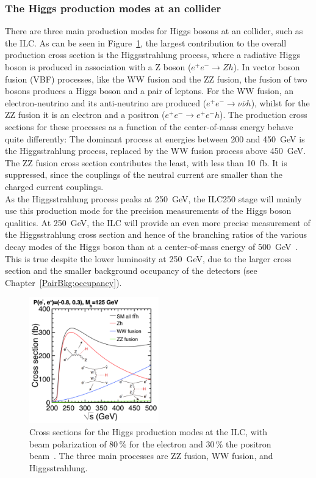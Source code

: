 \subsubsection{The Higgs production modes at an \positron\electron collider}
There are three main production modes for Higgs bosons at an \positron\electron collider, such as the ILC.
As can be seen in Figure~\ref{fig:HiggsProduction}, the largest contribution to the overall production cross section is the Higgsstrahlung process, where a radiative Higgs boson is produced in association with a Z boson ($e^+e^-\rightarrow Zh$).
In vector boson fusion (VBF) processes, like the WW fusion and the ZZ fusion, the fusion of two bosons produces a Higgs boson and a pair of leptons.
For the WW fusion, an electron-neutrino and its anti-neutrino are produced ($e^+e^-\rightarrow \nu\bar{\nu} h$), whilst for the ZZ fusion it is an electron and a positron ($e^+e^-\rightarrow e^+e^-h$).
The production cross sections for these processes as a function of the center-of-mass energy behave quite differently:
The dominant process at energies between 200 and \SI{450}{\GeV} is the Higgsstrahlung process, replaced by the WW fusion process above \SI{450}{\GeV}.
The ZZ fusion cross section contributes the least, with less than \SI{10}{fb}.
It is suppressed, since the couplings of the neutral current are smaller than the charged current couplings.\\
As the Higgsstrahlung process peaks at \SI{250}{\GeV}, the ILC250 stage will mainly use this production mode for the precision measurements of the Higgs boson qualities.
At \SI{250}{\GeV}, the ILC will provide an even more precise measurement of the Higgsstrahlung cross section and hence of the branching ratios of the various decay modes of the Higgs boson than at a center-of-mass energy of \SI{500}{\GeV}~\cite[p. 14]{PhysicsCase}.
This is true despite the lower luminosity at \SI{250}{\GeV}, due to the larger cross section and the smaller background occupancy of the detectors (see Chapter~\ref{PairBkg:occupancy}).
\begin{figure}
\centering
\includegraphics[width=0.5\textwidth]{Figures/HiggsProductionCrossSection.png}
\caption[Cross section for the Higgs production modes at ILC]{Cross sections for the Higgs production modes at the ILC, with beam polarization of 80\,\% for the electron and 30\,\% the positron beam~\cite[p. 13]{PhysicsCase}.
The three main processes are ZZ fusion, WW fusion, and Higgsstrahlung.}
\label{fig:HiggsProduction}
\end{figure}

